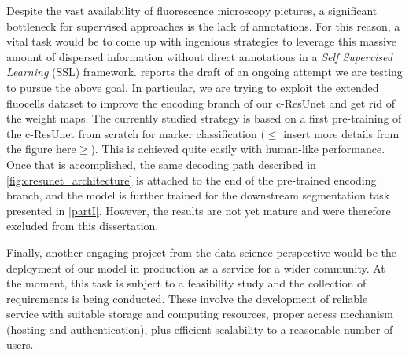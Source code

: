 Despite the vast availability of fluorescence microscopy pictures, a significant bottleneck for supervised approaches is the lack of annotations. 
For this reason, a vital task would be to come up with ingenious strategies to leverage this massive amount of dispersed information without direct annotations in a \textit{Self Supervised Learning} (SSL) framework.
 reports the draft of an ongoing attempt we are testing to pursue the above goal. 
In particular, we are trying to exploit the extended fluocells dataset to improve the encoding branch of our c-ResUnet and get rid of the weight maps. The currently studied strategy is based on a first pre-training of the c-ResUnet from scratch for marker classification ($\leq$ insert more details from the figure here$\geq$). This is achieved quite easily with human-like performance.
Once that is accomplished, the same decoding path described in \cref{fig:cresunet_architecture} is attached to the end of the pre-trained encoding branch, and the model is further trained for the downstream segmentation task presented in \cref{partI}.
However, the results are not yet mature and were therefore excluded from this dissertation.

Finally, another engaging project from the data science perspective would be the deployment of our model in production as a service for a wider community. 
At the moment, this task is subject to a feasibility study and the collection of requirements is being conducted. These involve the development of reliable service with suitable storage and computing resources, proper access mechanism (hosting and authentication), plus efficient scalability to a reasonable number of users.